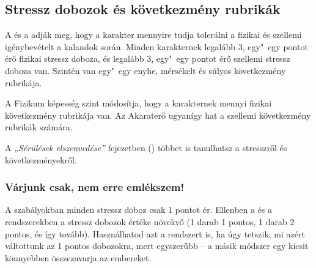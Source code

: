 \subsection{Stressz dobozok és következmény rubrikák}

A  és a  adják meg, hogy a karakter mennyire tudja tolerálni a fizikai és szellemi igénybevételt a kalandok során. Minden karakternek legalább 3, egy"~egy pontot érő fizikai stressz doboza, és legalább 3, egy"~egy pontot érő szellemi stressz doboza van. Szintén van egy"~egy enyhe, mérsékelt és súlyos következmény rubrikája.

A Fizikum képesség szint módosítja, hogy a karakternek mennyi fizikai következmény rubrikája van. Az Akaraterő ugyanígy hat a szellemi következmény rubrikák számára.

\begin{center}
\end{center}

A \textit{„Sérülések elszenvedése”} fejezetben () többet is tanulhatsz a stresszről és következményekről.

\subsubsection{Várjunk csak, nem erre emlékszem!}

A  szabályokban minden stressz doboz csak 1 pontot ér. Ellenben a  és a  rendszerekben a stressz dobozok értéke növekvő (1 darab 1 pontos, 1 darab 2 pontos, és így tovább). Használhatod azt a rendszert is, ha úgy tetszik; mi azért váltottunk az 1 pontos dobozokra, mert egyszerűbb – a másik módszer egy kicsit könnyebben összezavarja az embereket.

